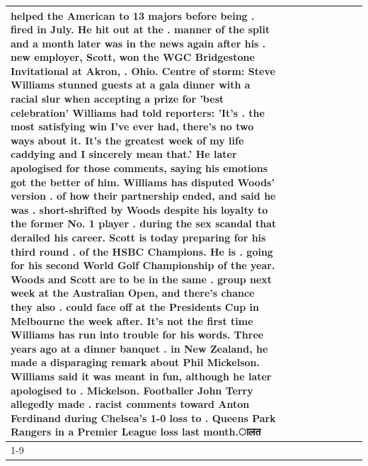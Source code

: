 \begin{table}[H]
\begin{tabular}{lllrlllll}
helped the American to 13 majors before being . fired in July. He hit out at the . manner of the split and a month later was in the news again after his . new employer, Scott, won the WGC Bridgestone Invitational at Akron, . Ohio. Centre of storm: Steve Williams stunned guests at a gala dinner with a racial slur when accepting a prize for 'best celebration' Williams had told reporters: 'It's . the most satisfying win I've ever had, there's no two ways about it. It's the greatest week of my life caddying and I sincerely mean that.' He later apologised for those comments, saying his emotions got the better of him. Williams has disputed Woods' version . of how their partnership ended, and said he was . short-shrifted by Woods despite his loyalty to the former No. 1 player . during the sex scandal that derailed his career. Scott is today preparing for his third round . of the HSBC Champions. He is . going for his second World Golf Championship of the year. Woods and Scott are to be in the same . group next week at the Australian Open, and there's chance they also . could face off at the Presidents Cup in Melbourne the week after. It's not the first time Williams has run into trouble for his words. Three years ago at a dinner banquet . in New Zealand, he made a disparaging remark about Phil Mickelson. Williams said it was meant in fun, although he later apologised to . Mickelson. Footballer John Terry allegedly made . racist comments toward Anton Ferdinand during Chelsea's 1-0 loss to . Queens Park Rangers in a Premier League loss last month.ालत \\
\cline{1-9}

\end{tabular}
\end{table}
